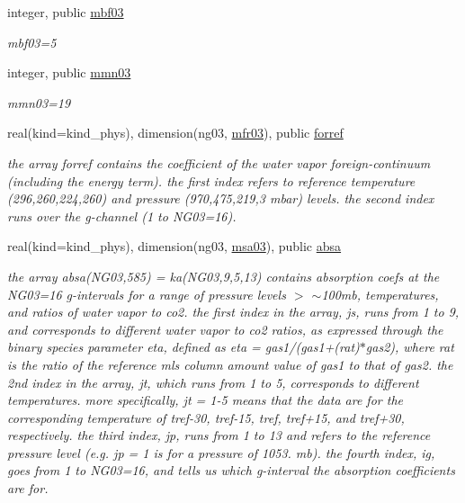 \begin{DoxyCompactItemize}
integer, public \hyperlink{group__module__radlw__kgbnn_ga655fff8711d78d62ae9d4fa27d02621a}{mbf03}
\begin{DoxyCompactList}\small\item\em mbf03=5 \end{DoxyCompactList}\item 
integer, public \hyperlink{group__module__radlw__kgbnn_gab4e84b10460930267256c0e5a1fe7a55}{mmn03}
\begin{DoxyCompactList}\small\item\em mmn03=19 \end{DoxyCompactList}\item 
real(kind=kind\+\_\+phys), dimension(ng03, \hyperlink{group__module__radlw__kgbnn_ga4ea1e58a39585adc087718b92a16b529}{mfr03}), public \hyperlink{group__module__radlw__kgbnn_gafcc55fa81ba6369b56d29db2342c2e6a}{forref}
\begin{DoxyCompactList}\small\item\em the array forref contains the coefficient of the water vapor foreign-\/continuum (including the energy term). the first index refers to reference temperature (296,260,224,260) and pressure (970,475,219,3 mbar) levels. the second index runs over the g-\/channel (1 to N\+G03=16). \end{DoxyCompactList}\item 
real(kind=kind\+\_\+phys), dimension(ng03, \hyperlink{namespacemodule__radlw__kgb03_a78658032153f7a4cbeaa198cbe661244}{msa03}), public \hyperlink{group__module__radlw__kgbnn_gac65fd4afedbd4bfa2c87c5e4f060a1d4}{absa}
\begin{DoxyCompactList}\small\item\em the array absa(\+N\+G03,585) = ka(\+N\+G03,9,5,13) contains absorption coefs at the N\+G03=16 g-\/intervals for a range of pressure levels $>$ $\sim$100mb, temperatures, and ratios of water vapor to co2. the first index in the array, js, runs from 1 to 9, and corresponds to different water vapor to co2 ratios, as expressed through the binary species parameter eta, defined as eta = gas1/(gas1+(rat)$\ast$gas2), where rat is the ratio of the reference mls column amount value of gas1 to that of gas2. the 2nd index in the array, jt, which runs from 1 to 5, corresponds to different temperatures. more specifically, jt = 1-\/5 means that the data are for the corresponding temperature of tref-\/30, tref-\/15, tref, tref+15, and tref+30, respectively. the third index, jp, runs from 1 to 13 and refers to the reference pressure level (e.\+g. jp = 1 is for a pressure of 1053. mb). the fourth index, ig, goes from 1 to N\+G03=16, and tells us which g-\/interval the absorption coefficients are for. \end{DoxyCompactList}\item 

\end{DoxyCompactItemize}
